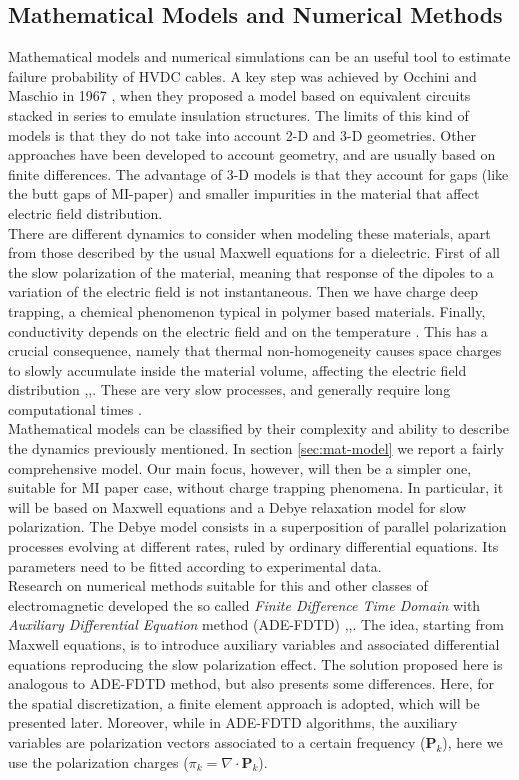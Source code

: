 \documentclass[11pt,a4paper]{article}
\begin{document}
\subsection{Mathematical Models and Numerical Methods}\label{sec:mmnm}
Mathematical models and numerical simulations can be an useful tool to estimate failure probability of HVDC cables. A key step was achieved by Occhini and Maschio in 1967 \cite{4073280}, when they proposed a model based on equivalent circuits stacked in series to emulate insulation structures. The limits of this kind of models is that they do not take into account 2-D and 3-D geometries. Other approaches have been developed to account geometry, and are usually based on finite differences. The advantage of 3-D models is that they account for gaps (like the butt gaps of MI-paper) and smaller impurities in the material that affect electric field distribution.\\
There are different dynamics to consider when modeling these materials, apart from those described by the usual Maxwell equations for a dielectric. First of all the slow polarization of the material, meaning that response of the dipoles to a variation of the electric field is not instantaneous. Then we have charge deep trapping, a chemical phenomenon typical in polymer based materials. Finally, conductivity depends on the electric field and on the temperature \cite{time-dep-layered}. This has a crucial consequence, namely that thermal non-homogeneity causes space charges to slowly accumulate inside the material volume, affecting the electric field distribution \cite{en13195189},\cite{8939463},\cite{grading-techniques}. These are very slow processes, and generally require long computational times \cite{https://doi.org/10.1002/jnm.2713}.\\
Mathematical models can be classified by their complexity and ability to describe the dynamics previously mentioned. In section \ref{sec:mat-model} we report a fairly comprehensive model. Our main focus, however, will then be a simpler one, suitable for MI paper case, without charge trapping phenomena. In particular, it will be based on Maxwell equations and a Debye relaxation model for slow polarization. The Debye model consists in a superposition of parallel polarization processes evolving at different rates, ruled by ordinary differential equations. Its parameters need to be fitted according to experimental data.\\
Research on numerical methods suitable for this and other classes of electromagnetic developed the so called \textit{Finite Difference Time Domain} with \textit{Auxiliary Differential Equation} method (ADE-FDTD) \cite{taflove},\cite{ADE-FDTD-thesis},\cite{ADE-FDTD-art}. The idea, starting from Maxwell equations, is to introduce auxiliary variables and associated differential equations reproducing the slow polarization effect. The solution proposed here is analogous to ADE-FDTD method, but also presents some differences. Here, for the spatial discretization, a finite element approach is adopted, which will be presented later. Moreover, while in ADE-FDTD algorithms, the auxiliary variables are polarization vectors associated to a certain frequency (\(\mathbf{P}_k\)), here we use the polarization charges (\(\pi_k=\nabla \cdot\mathbf{P}_k\)).
\end{document}
